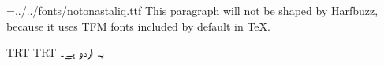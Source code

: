 
\pagewidth=210mm
\pageheight=297mm
\hsize=210mm
\hsize=190mm
\hoffset=10mm
\nopagenumbers
\parindent=0mm
\font\noto={../../fonts/notonastaliq.ttf}
This paragraph will not be shaped by Harfbuzz, because it uses TFM fonts included by default in \TeX.

\textdir TRT
\pardir TRT
\noto
یہ اردو ہے۔
\bye
